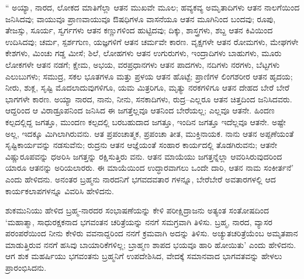 “ ಅಯ್ಯಾ, ನಾರದ, ಲೋಕದ ಮಾತಿಗೆಲ್ಲಾ ಆತನ ಮುಖವೇ ಮೂಲ; ಹವ್ಯಕವ್ಯ ಅಮೃತಾದಿಗಳು ಆತನ ನಾಲಗೆಯಿಂದ ಜನಿಸಿದವು; ವಾಯುವೂ ಪ್ರಾಣವಾಯುವೂ ಔಷಧಿಗಳೂ ವಾಸನೆಯೂ ಆತನ ಮೂಗಿನಿಂದ ಬಂದವು; ರೂಪು, ತೇಜಸ್ಸು, ಸೂರ್ಯ, ಸ್ವರ್ಗಗಳು ಆತನ ಕಣ್ಣುಗಳಿಂದ ಹುಟ್ಟಿದವು; ದಿಕ್ಕು, ಶಾಸ್ತ್ರಗಳು, ಶಬ್ದ ಆತನ ಕಿವಿಯಿಂದ ಉದಿಸಿದವು; ಚರ್ಮ, ಸ್ಪರ್ಶಗುಣ, ಯಜ್ಞಗಳಿಗೆ ಆತನ ಚರ್ಮವೇ ಕಾರಣ. ವೃಕ್ಷಗಳೇ ಆತನ ರೋಮಗಳು, ಮೇಘಗಳೇ ಕೇಶಗಳು, ಮಿಂಚು ಗಡ್ಡ ಮೀಸೆ; ಶಿಲೆ, ಲೋಹಗಳು ಆತನ ಉಗುರುಗಳು, ಇಂದ್ರಾದಿಗಳು ಬಾಹುಗಳು, ಮೂರು ಲೋಕಗಳೇ ಆತನ ನಡಗೆ; ಕ್ಷೇಮ, ಅಭಯ, ವರಪ್ರಧಾನಗಳು ಆತನ ಪಾದಗಳು, ನದಿಗಳು ನರಗಳು, ಬೆಟ್ಟಗಳು ಎಲುಬುಗಳು; ಸಮುದ್ರ, ಸಕಲ ಭೂತಗಳೂ ಮತ್ತು ಪ್ರಳಯ ಆತನ ಹೊಟ್ಟೆ; ಪ್ರಾಣಿಗಳ ಲಿಂಗಶರೀರ ಆತನ ಹೃದಯ; ನೀರು, ಶುಕ್ಲ, ಸೃಷ್ಟಿ ಮೊದಲಾದುವುಗಳಿಗೂ, ಯಮ ಮಿತ್ರರಿಗೂ, ಮೃತ್ಯು ನರಕಗಳಿಗೂ ಆತನ ದೇಹದ ಬೇರೆ ಬೇರೆ ಭಾಗಗಳೇ ಕಾರಣ. ಅಯ್ಯಾ ನಾರದ, ನಾನು, ನೀನು, ಸನಕಾದಿಗಳು, ರುದ್ರ–ಎಲ್ಲರೂ ಆತನ ಚಿತ್ತದಿಂದ ಜನಿಸಿದವರು. ಆದ್ದರಿಂದ ಆ ವಿರಾಡ್ರೂಪನಿಂದ ಜನಿಸಿದ ಈ ಜಗತ್ತೆಲ್ಲವೂ ಆತನಿಂದ ಬೇರೆಯಲ್ಲ; ಎಲ್ಲವೂ ಆತನೇ. ಹಿಂದಣ ಕಲ್ಪದಲ್ಲಿದ್ದ ಜಗತ್ತೂ, ಮುಂದಣ ಕಲ್ಪದಲ್ಲಿ ಬರಬಹುದಾದ ಜಗತ್ತೂ, ಇಂದಿನ ಜಗತ್ತೂ ಇದೆಲ್ಲವೂ ಆತನೇ. ಅಷ್ಟೇ ಅಲ್ಲ, ಇದಕ್ಕೂ ಮಿಗಿಲಾಗಿರುವನು. ಆತ ಪ್ರಪಂಚಾತ್ಮಕ, ಪ್ರಪಂಚಾ ತೀತ, ಮುಕ್ತಿನಾಯಕ. ನಾನು ಆತನ ಅಪ್ಪಣೆಯಂತೆ ಸೃಷ್ಟಿಕಾರ್ಯವನ್ನು ನಡಸುವೆನು; ರುದ್ರನು ಆತನ ಆಜ್ಞೆಯಂತೆ ಸಂಹಾರ ಕಾರ್ಯದಲ್ಲಿ ತೊಡಗಿರುವನು; ಆತನೇ ವಿಷ್ಣುರೂಪವನ್ನು ಧಅರಿಸಿ ಜಗತ್ತನ್ನು ರಕ್ಷಿಸುತ್ತಿರು ವನು. ಆತನ ಮಾಯೆಯು ಜಗತ್ತನ್ನೆಲ್ಲಾ ಆವರಿಸಿರುವುದರಿಂದ ಯಾರೂ ಆತನನ್ನು ಅರಿಯಲಾರರು. ಈ ಮಾಯೆಯಿಂದ ಉದ್ಧಾರವಾಗಲು ಒಂದೇ ದಾರಿ, ಆತನ ನಾಮ ಸಂಕೀರ್ತನೆ’ ಎಂದು ಹೇಳಿದನು. ಅನಂತರ ಬ್ರಹ್ಮನು ನಾರದನಿಗೆ ಭಗವದವತಾರ ಗಳನ್ನೂ, ಬೇರೆಬೇರೆ ಅವತಾರಗಳಲ್ಲಿ ಆದ ಕಾರ್ಯಕಲಾಪಗಳನ್ನೂ ವಿವರಿಸಿ ಹೇಳಿದನು.

ಶುಕಮುನಿಯು ಹೇಳಿದ ಬ್ರಹ್ಮ-ನಾರದರ ಸಂಭಾಷಣೆಯನ್ನು ಕೇಳಿ ಪರೀಕ್ಷಿದ್ರಾಜನು ಅತ್ಯಂತ ಸಂತೋಷದಿಂದ ‘ಮಹಾತ್ಮಾ, ಸಾಧುರಕ್ಷಕನಾದ ಭಗವಂತನ ಚರಿತ್ರೆಯನ್ನು ನನಗೆ ಸಮಗ್ರವಾಗಿ ತಿಳಿಸು. ಬ್ರಹ್ಮ, ನಾರದ, ವ್ಯಾಸರ ಪರಂಪರೆಯಿಂದ ನೀನು ಕೇಳಿರು ವವನಾದ್ದರಿಂದ ನನಗೆ ಕ್ರಮವಾಗಿ ಅದನ್ನು ತಿಳಿಸು. ಅಚ್ಯುತಚರಿತ್ರೆಯೆಂಬ ಅಮೃತಪಾನ ಮಾಡುತ್ತಿರುವ ನನಗೆ ಹಸಿವು ಬಾಯಾರಿಕೆಗಳಿಲ್ಲ; ಬ್ರಾಹ್ಮಣ ಶಾಪದ ಭಯವೂ ಹಾರಿ ಹೋಯಿತು’ ಎಂದು ಹೇಳಿದನು. ಆಗ ಶುಕ ಮಹರ್ಷಿಯು ಭಗವಂತನು ಬ್ರಹ್ಮನಿಗೆ ಉಪದೇಶಿಸಿದ, ವೇದಕ್ಕೆ ಸಮಾನವಾದ ಭಾಗವತವನ್ನು ಹೇಳಲು ಪ್ರಾರಂಭಿಸಿದನು.

